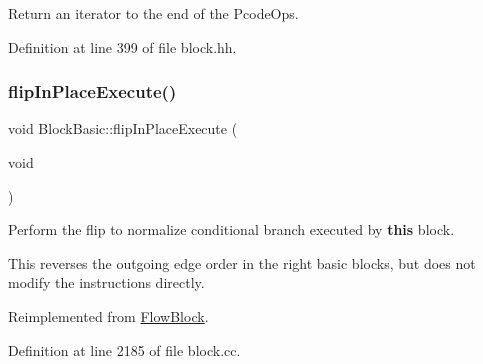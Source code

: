 Return an iterator to the end of the Pcode\+Ops. 



Definition at line 399 of file block.\+hh.

\mbox{\label{class_block_basic_a2949ef4a8d42f16c696fd24ba2ecb58c}} 
\subsubsection{\texorpdfstring{flipInPlaceExecute()}{flipInPlaceExecute()}}
{\footnotesize\ttfamily void Block\+Basic\+::flip\+In\+Place\+Execute (\begin{DoxyParamCaption}\item[{void}]{ }\end{DoxyParamCaption})\hspace{0.3cm}{\ttfamily [virtual]}}



Perform the flip to normalize conditional branch executed by {\bfseries{this}} block. 

This reverses the outgoing edge order in the right basic blocks, but does not modify the instructions directly. 

Reimplemented from \mbox{\hyperlink{class_flow_block_a263ec50d30f807a8e1286ac37c6728ce}{Flow\+Block}}.



Definition at line 2185 of file block.\+cc.

